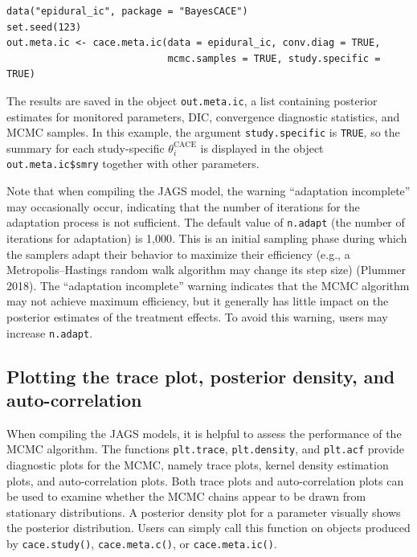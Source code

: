 \begin{verbatim}
data("epidural_ic", package = "BayesCACE")
set.seed(123)
out.meta.ic <- cace.meta.ic(data = epidural_ic, conv.diag = TRUE, 
                            mcmc.samples = TRUE, study.specific = TRUE)
\end{verbatim}

\noindent The results are saved in the object \texttt{out.meta.ic}, a list containing posterior estimates for monitored parameters, DIC, convergence diagnostic statistics, and MCMC samples.
In this example, the argument \texttt{study.specific} is \texttt{TRUE}, so the summary for each study-specific \(\theta^\text{CACE}_i\) is displayed in the object \texttt{out.meta.ic\$smry}
together with other parameters.

Note that when compiling the \textsf{JAGS} model, the warning ``adaptation incomplete'' may occasionally occur, indicating that the number of iterations for the adaptation process is not sufficient. The default value of \texttt{n.adapt} (the number of iterations for adaptation) is 1,000. This is an initial sampling phase during which the samplers adapt their behavior to maximize their efficiency (e.g., a Metropolis--Hastings random walk algorithm may change its step size) (Plummer 2018). The ``adaptation incomplete'' warning indicates that the MCMC algorithm may not achieve maximum efficiency, but it generally has little impact on the posterior estimates of the treatment effects. To avoid this warning, users may increase \texttt{n.adapt}.

\hypertarget{plotting-the-trace-plot-posterior-density-and-auto-correlation}{%
\subsection{Plotting the trace plot, posterior density, and auto-correlation}\label{plotting-the-trace-plot-posterior-density-and-auto-correlation}}

When compiling the \textsf{JAGS} models, it is helpful to assess the performance of the MCMC algorithm. The functions \texttt{plt.trace}, \texttt{plt.density}, and \texttt{plt.acf} provide diagnostic plots for the MCMC, namely trace plots, kernel density estimation plots, and auto-correlation plots. Both trace plots and auto-correlation plots can be used to examine whether the MCMC chains appear to be drawn from stationary distributions. A posterior density plot for a parameter visually shows the posterior distribution.
Users can simply call this function on objects produced by \texttt{cace.study()}, \texttt{cace.meta.c()}, or \texttt{cace.meta.ic()}.

